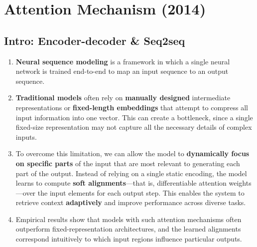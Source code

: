 \chapter{Attention Mechanism (2014)}

\begin{tcolorbox}
\end{tcolorbox}



\section{Intro: Encoder-decoder \& Seq2seq}

\begin{enumerate}
    \item \textbf{Neural sequence modeling} is a framework in which a single neural network is trained end-to-end to map an input sequence to an output sequence. 
    \hfill \cite{arxiv/1409.0473/NMT-Jointly-Learning-Align-Translate, common/online/chatgpt}

    \item \textbf{Traditional models} often rely on \textbf{manually designed} intermediate representations or \textbf{fixed-length embeddings} that attempt to compress all input information into one vector. 
    This can create a bottleneck, since a single fixed-size representation may not capture all the necessary details of complex inputs. 
    \hfill \cite{arxiv/1409.0473/NMT-Jointly-Learning-Align-Translate, common/online/chatgpt}

    \item To overcome this limitation, we can allow the model to \textbf{dynamically focus on specific parts} of the input that are most relevant to generating each part of the output. 
    Instead of relying on a single static encoding, the model learns to compute \textbf{soft alignments}—that is, differentiable attention weights—over the input elements for each output step. 
    This enables the system to retrieve context \textbf{adaptively} and improve performance across diverse tasks.
    \hfill \cite{arxiv/1409.0473/NMT-Jointly-Learning-Align-Translate, common/online/chatgpt}

    \item Empirical results show that models with such attention mechanisms often outperform fixed-representation architectures, and the learned alignments correspond intuitively to which input regions influence particular outputs.
    \hfill \cite{arxiv/1409.0473/NMT-Jointly-Learning-Align-Translate, common/online/chatgpt}


\end{enumerate}
